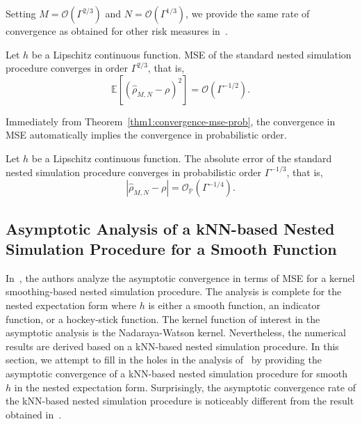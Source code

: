 Setting $M = \mathcal{O}(\Gamma^{2/3})$ and $N = \mathcal{O}(\Gamma^{1/3})$, we provide the same rate of convergence as obtained for other risk measures in~\cite{gordy2010nested}.

\begin{theorem}
    Let $h$ be a Lipschitz continuous function. 
    MSE of the standard nested simulation procedure converges in order $\Gamma^{2/3}$, that is,
    $$\mathbb{E} \left[ \left( \hat{\rho}_{M, N} - \rho \right)^2 \right] = \mathcal{O}(\Gamma^{-1/2}).$$
\end{theorem}

Immediately from Theorem~\ref{thm1:convergence-mse-prob}, the convergence in MSE automatically implies the convergence in probabilistic order.

\begin{corollary}
    Let $h$ be a Lipschitz continuous function. The absolute error of the standard nested simulation procedure converges in probabilistic order $\Gamma^{-1/3}$, that is,
    $$\left| \hat{\rho}_{M, N} - \rho \right| = \mathcal{O}_\mathbb{P}(\Gamma^{-1/4}).$$
\end{corollary}

\subsection{Asymptotic Analysis of a kNN-based Nested Simulation Procedure for a Smooth Function}

In~\cite{hong2017kernel}, the authors analyze the asymptotic convergence in terms of MSE for a kernel smoothing-based nested simulation procedure.
The analysis is complete for the nested expectation form where $h$ is either a smooth function, an indicator function, or a hockey-stick function.
The kernel function of interest in the asymptotic analysis is the Nadaraya-Watson kernel.
Nevertheless, the numerical results are derived based on a kNN-based nested simulation procedure.
In this section, we attempt to fill in the holes in the analysis of~\cite{hong2017kernel} by providing the asymptotic convergence of a kNN-based nested simulation procedure for smooth $h$ in the nested expectation form.
Surprisingly, the asymptotic convergence rate of the kNN-based nested simulation procedure is noticeably different from the result obtained in~\cite{hong2017kernel}.

